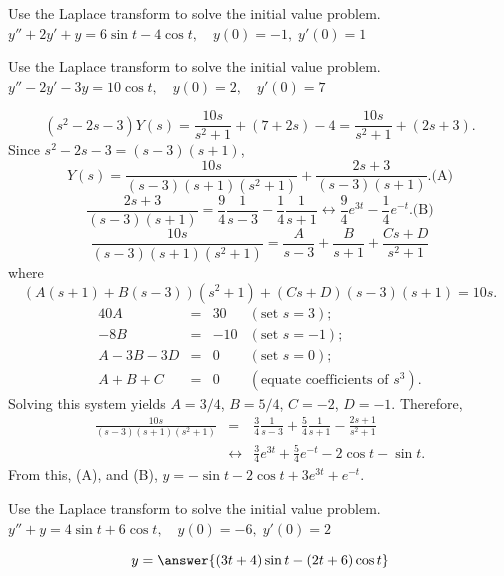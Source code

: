 \documentclass{ximera}
\begin{document}
\begin{problem}\label{exer:8.3.23} Use the Laplace transform to solve the initial value problem. $y''+2y'+y=6\sin t-4\cos t, \quad  y(0)=-1,\;
y'(0)=1$
\end{problem}

\begin{problem}\label{exer:8.3.24} Use the Laplace transform to solve the initial value problem. $y''-2y'-3y=10\cos t, \quad  y(0)=2,\quad y'(0)=7$

\begin{solution}
$$
(s^2-2s-3)Y(s)=\frac{10s}{s^2+1}+(7+2s)-4=
\frac{10s}{s^2+1}+(2s+3).
$$
Since $s^2-2s-3=(s-3)(s+1)$,
$$
Y(s)=
\frac{10s}{(s-3)(s+1)(s^2+1)}+\frac{2s+3}{(s-3)(s+1)}.
\text{(A)}
$$
$$
\frac{2s+3}{(s-3)(s+1)}=\frac{9}{4}\frac{1}{s-3}-\frac{1}{4}\frac{1}{s+1}
\leftrightarrow\frac{9}{4}e^{3t}-\frac{1}{4}e^{-t}.
\text{(B)}
$$
$$
\frac{10s}{(s-3)(s+1)(s^2+1)}=\frac{A}{s-3}+\frac{B}{s+1}+\frac{Cs+D}{s^2+1}
$$
 where
$$
(A(s+1)+B(s-3))(s^2+1)+(Cs+D)(s-3)(s+1)=10s.
$$
$$
\begin{array}{rcrl}
40A&=&30&(\mbox{set }s=3);\\
-8B&=&-10& (\mbox{set }s=-1);\\
A-3B-3D&=&0& (\mbox{set }s=0);\\
A+B+C&=&0&(\mbox{equate coefficients of }s^3).
\end{array}
$$
Solving this system yields $A=3/4$, $B=5/4$,
$C=-2$, $D=-1$. Therefore,
\begin{eqnarray*}
\frac{10s}{(s-3)(s+1)(s^2+1)}
&=&\frac{3}{4}\frac{1}{s-3}+\frac{5}{4}\frac{1}{s+1}-\frac{2s+1}{s^2+1}
\\&\leftrightarrow&
\frac{3}{4}e^{3t}+\frac{5}{4}e^{-t}-2\cos t-\sin t.
\end{eqnarray*}
From this, (A), and (B),
 $y=-\sin t-2\cos t+3e^{3t}+e^{-t}$.
\end{solution}
\end{problem}

\begin{problem}\label{exer:8.3.25} Use the Laplace transform to solve the initial value problem. $y''+y=4\sin t+6\cos t, \quad  y(0)=-6,\;
y'(0)=2$

$$y=\answer{(3t+4)\sin{t}-(2t+6)\cos{t}}$$

\end{problem}
\end{document}
